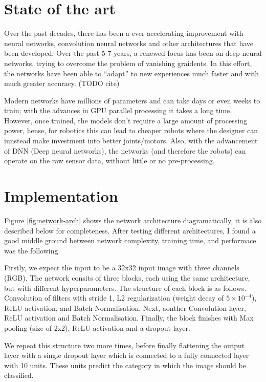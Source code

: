 \documentclass[12pt]{article}
\begin{document}
\section{State of the art}
\label{sec:soa}
Over the past decades, there has been a ever accelerating improvement with neural networks, convolution neural networks and other architectures that have been developed. Over the past 5-7 years, a renewed focus has been on deep neural networks, trying to overcome the problem of vanishing graidents. In this effort, the networks have been able to ``adapt'' to new experiences much faster and with much greater accuracy. (TODO cite)

Modern networks have millions of parameters and can take days or even weeks to train; with the advances in GPU parallel processing it takes a long time. However, once trained, the models don't require a large amount of processing power, hense, for robotics this can lead to cheaper robots where the designer can innstead make investment into better joints/motors. Also, with the advancement of DNN (Deep neural networks), the networks (and therefore the robots) can operate on the raw sensor data, without little or no pre-processing.




\section{Implementation}
\label{sec:imple}
Figure \ref{fig:network-arch} shows the network architecture diagramatically, it is also described below for completeness. After testing different architectures, I found a good middle ground between network complexity, training time, and performace was the following.

Firstly, we expect the input to be a 32x32 input image with three channels (RGB). The network consits of three blocks, each using the same architecture, but with different hyperparameters. The structure of each block is as follows. Convolution of filters with stride 1, L2 regularization (weight decay of $5\times 10^{-4}$), ReLU activation, and Batch Normalisation. Next, aonther Convolution layer, ReLU activation and Batch Normalisation. Finally, the block finishes with Max pooling (size of 2x2), ReLU activation and a dropout layer.

We repeat this structure two more times, before finally flattening the output layer with a single dropout layer which is connected to a fully connected layer with 10 units. These units predict the category in which the image should be classified.
\end{document}
